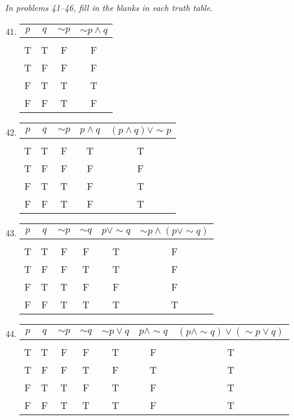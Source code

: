 \emph{In problems 41--46, fill in the blanks in each truth table.}
\begin{enumerate}
\setcounter{enumi}{40}

\item 
\begin{center}
\begin{tabular}{|c | c | c | c|}
\hline
$p$ & $q$ & $\sim p$ & $\sim p \wedge q$\\
\hline
& & &\\
T & T & F & F\\
T & F & F & F\\
F & T & T & T\\
F & F & T & F\\
\hline
\end{tabular}
\end{center}

\item 
\begin{center}
\begin{tabular}{|c | c | c | c | c|}
\hline
$p$ & $q$ & $\sim p$ & $p \wedge q$ & $(p \wedge q) \vee \sim p$\\
\hline
& & & &\\
T & T & F & T & T\\
T & F & F & F & F\\
F & T & T & F & T\\
F & F & T & F & T\\
\hline
\end{tabular}
\end{center}

\item 
\begin{center}
\begin{tabular}{|c | c | c | c | c | c|}
\hline
$p$ & $q$ & $\sim p$ & $\sim q$ & $p \vee \sim 	q$ & $\sim p \wedge (p \vee \sim q)$\\
\hline
& & & & & \\
T & T & F & F & T & F\\
T & F & F & T & T & F\\
F & T & T & F & F & F\\
F & F & T & T & T & T\\
\hline
\end{tabular}
\end{center}

\item 
\begin{center}
\begin{tabular}{|c | c | c | c | c | c | c|}
\hline
$p$ & $q$ & $\sim p$ & $\sim q$ & $\sim p \vee q$ & $p \wedge \sim q$ & $(p \wedge \sim q) \vee (\sim p \vee q)$\\
\hline
& & & & & & \\
T & T & F & F & T & F & T\\
T & F & F & T & F & T & T\\
F & T & T & F & T & F & T\\
F & F & T & T & T & F & T\\
\hline
\end{tabular}
\end{center}


\end{enumerate}
